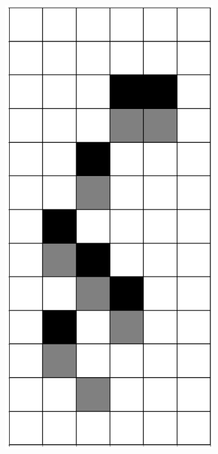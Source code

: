\documentclass[12pt]{article}
\numberwithin{figure}{section} %
\begin{document}
\begin{figure}[H]
     \begin{subfigure}{0.3\textwidth}
     \centering
     \includegraphics[angle=270,width=\linewidth]{Section4/11.1}

\end{subfigure}
\end{figure}
\end{document}
